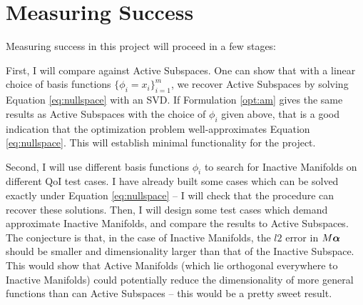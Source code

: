 \documentclass{article}
\begin{document}
\newpage
\section{Measuring Success}
Measuring success in this project will proceed in a few stages:

First, I will compare against Active Subspaces. One can show that with a linear choice of basis functions $\{\phi_i=x_i\}_{i=1}^m$, we recover Active Subspaces by solving Equation \ref{eq:nullspace} with an SVD. If Formulation \ref{opt:am} gives the same results as Active Subspaces with the choice of $\phi_i$ given above, that is a good indication that the optimization problem well-approximates Equation \ref{eq:nullspace}. This will establish minimal functionality for the project.

Second, I will use different basis functions $\phi_i$ to search for Inactive Manifolds on different QoI test cases. I have already built some cases which can be solved exactly under Equation \ref{eq:nullspace} -- I will check that the procedure can recover these solutions. Then, I will design some test cases which demand approximate Inactive Manifolds, and compare the results to Active Subspaces. The conjecture is that, in the case of Inactive Manifolds, the $l2$ error in $M\boldsymbol{\alpha}$ should be smaller and dimensionality larger than that of the Inactive Subspace. This would show that Active Manifolds (which lie orthogonal everywhere to Inactive Manifolds) could potentially reduce the dimensionality of more general functions than can Active Subspaces -- this would be a pretty sweet result.



\end{document}
